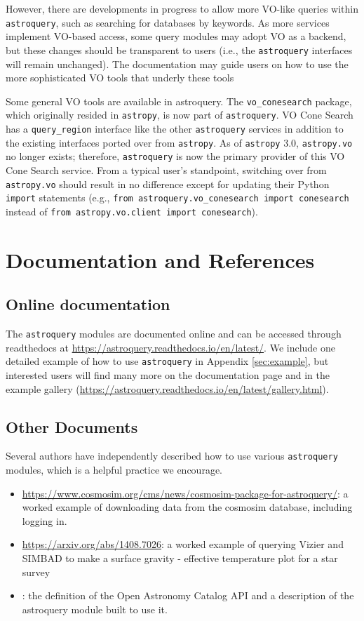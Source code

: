 \documentclass[twocolumn]{aastex62}
\newcommand{\package}[1]{\texttt{#1}\xspace}
\newcommand{\astroquery}{\package{astroquery}}
\newcommand{\astropypkg}{\package{astropy}}
\begin{document}
However, there are developments in progress to allow more VO-like queries
within \astroquery, such as searching for databases by keywords.  As more
services implement VO-based access, some query modules may adopt VO as a backend,
but these changes should be transparent to users (i.e., the \astroquery
interfaces will remain unchanged).  The documentation may guide users on how
to use the more sophisticated VO tools that underly these tools


Some general VO tools are available in astroquery.  The \texttt{vo\_conesearch}
package, which originally resided in \astropypkg, is now part of \astroquery.  VO
Cone Search has a \texttt{query\_region} interface like the other \astroquery
services in addition to the existing interfaces ported over from \astropypkg.
As of \astropypkg 3.0, \texttt{astropy.vo} no longer exists; therefore,
\astroquery is now the primary provider of this VO Cone Search service. From a
typical user's standpoint, switching over from \texttt{astropy.vo} should
result in no difference except for updating their Python \texttt{import}
statements (e.g., \texttt{from astroquery.vo\_conesearch import conesearch}
instead of \texttt{from astropy.vo.client import conesearch}).



\section{Documentation and References}
\label{sec:documentation}
\subsection{Online documentation}
The \astroquery modules are documented online and can be accessed through
readthedocs at \url{https://astroquery.readthedocs.io/en/latest/}.
We include one detailed example of how to use \astroquery in Appendix \ref{sec:example},
but interested users will find many more on the documentation page and
in the example gallery (\url{https://astroquery.readthedocs.io/en/latest/gallery.html}).

\subsection{Other Documents}
Several authors have independently described how to use various \astroquery
modules, which is a helpful practice we encourage.

\begin{itemize}
    \item
        \url{https://www.cosmosim.org/cms/news/cosmosim-package-for-astroquery/}:
        a worked example of downloading data from the cosmosim database,
        including logging in.
    \item \url{https://arxiv.org/abs/1408.7026}: a worked example of querying
        Vizier and SIMBAD to make a surface gravity - effective temperature
        plot for a star survey
    \item \citet{Guillochon2018a}: the definition of
        the Open Astronomy Catalog API and a description of the astroquery
        module built to use it.
\end{itemize}
\end{document}
